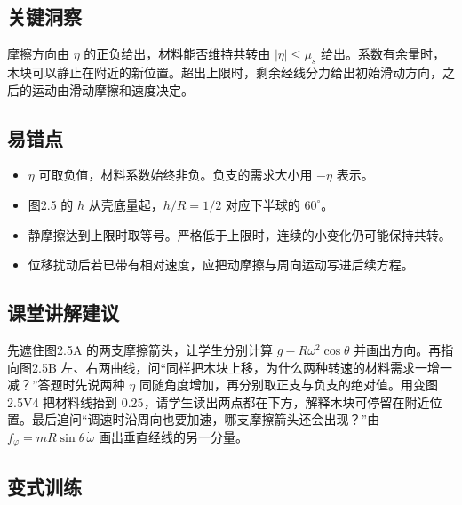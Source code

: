 \documentclass[UTF8,fontset=fandol,a4paper,11pt]{ctexart}
\begin{document}


\subsection*{关键洞察}

摩擦方向由 $\eta$ 的正负给出，材料能否维持共转由 $|\eta|\leq\mu_s$ 给出。系数有余量时，木块可以静止在附近的新位置。超出上限时，剩余经线分力给出初始滑动方向，之后的运动由滑动摩擦和速度决定。



\subsection*{易错点}

\begin{itemize}
\item $\eta$ 可取负值，材料系数始终非负。负支的需求大小用 $-\eta$ 表示。
\item 图2.5 的 $h$ 从壳底量起，$h/R=1/2$ 对应下半球的 $60^\circ$。
\item 静摩擦达到上限时取等号。严格低于上限时，连续的小变化仍可能保持共转。
\item 位移扰动后若已带有相对速度，应把动摩擦与周向运动写进后续方程。
\end{itemize}



\subsection*{课堂讲解建议}

先遮住图2.5A 的两支摩擦箭头，让学生分别计算 $g-R\omega^2\cos\theta$ 并画出方向。再指向图2.5B 左、右两曲线，问“同样把木块上移，为什么两种转速的材料需求一增一减？”答题时先说两种 $\eta$ 同随角度增加，再分别取正支与负支的绝对值。用变图2.5V4 把材料线抬到 $0.25$，请学生读出两点都在下方，解释木块可停留在附近位置。最后追问“调速时沿周向也要加速，哪支摩擦箭头还会出现？”由 $f_\varphi=mR\sin\theta\,\dot\omega$ 画出垂直经线的另一分量。



\subsection*{变式训练}
\end{document}
